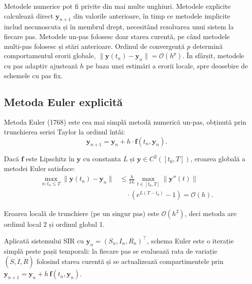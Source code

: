 Metodele numerice pot fi privite din mai multe unghiuri. Metodele explicite
calculează direct $\mathbf{y}_{n+1}$ din valorile anterioare, în timp ce metodele
implicite includ necunoscuta și în membrul drept, necesitând rezolvarea unui sistem
la fiecare pas. Metodele un-pas folosesc doar starea curentă, pe când metodele
multi-pas folosesc și stări anterioare. Ordinul de convergență $p$ determină
comportamentul erorii globale, $\|\mathbf{y}(t_n)-\mathbf{y}_n\|=\mathcal{O}(h^p)$.
În sfârșit, metodele cu pas adaptiv ajustează $h$ pe baza unei estimări a erorii
locale, spre deosebire de schemele cu pas fix.

\subsection{Metoda Euler explicită}
\label{subsec:euler}

Metoda Euler (1768) este cea mai simplă metodă numerică un-pas, obținută
prin trunchierea seriei Taylor la ordinul întâi:
\begin{equation}
\label{eq:euler}
    \mathbf{y}_{n+1} = \mathbf{y}_n + h \cdot \mathbf{f}(t_n, \mathbf{y}_n).
\end{equation}

\begin{teorema}
\label{thm:euler_eroare}
Dacă $\mathbf{f}$ este Lipschitz în $\mathbf{y}$ cu constanta $L$ și
$\mathbf{y} \in C^2([t_0, T])$, eroarea globală a metodei Euler satisface:
\begin{equation}
\begin{split}
    \max_{n: t_n \leq T} \|\mathbf{y}(t_n) - \mathbf{y}_n\|
    &\leq \frac{h}{2L} \max_{t \in [t_0, T]} \|\mathbf{y}''(t)\| \\
    &\quad \cdot \left(e^{L(T - t_0)} - 1\right)
    = \mathcal{O}(h).
\end{split}
\end{equation}
\end{teorema}

Eroarea locală de trunchiere (pe un singur pas) este $\mathcal{O}(h^2)$, deci
metoda are ordinul local 2 și ordinul global 1.

Aplicată sistemului SIR cu $\mathbf{y}_n = (S_n, I_n, R_n)^\intercal$,
schema Euler este o iterație simplă peste pașii temporali: la fiecare pas
se evaluează rata de variație $(\dot S, \dot I, \dot R)$ folosind starea
curentă și se actualizează compartimentele prin
$\mathbf{y}_{n+1} = \mathbf{y}_n + h\,\mathbf{f}(t_n, \mathbf{y}_n)$.

